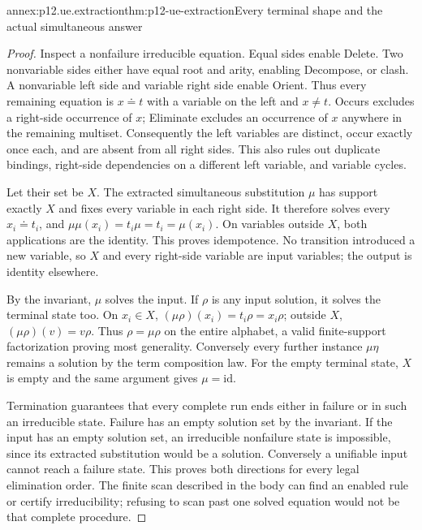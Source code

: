 \begin{annexitem}{annex:p12.ue.extraction}{thm:p12-ue-extraction}{Every terminal shape and the actual simultaneous answer}
\begin{proof}
Inspect a nonfailure irreducible equation. Equal sides enable Delete.
Two nonvariable sides either have equal root and arity, enabling
Decompose, or clash. A nonvariable left side and variable right side
enable Orient. Thus every remaining equation is \(x\doteq t\)
with a variable on the left and \(x\ne t\). Occurs excludes a
right-side occurrence of \(x\); Eliminate excludes an occurrence of
\(x\) anywhere in the remaining multiset. Consequently the left
variables are distinct, occur exactly once each, and are absent from
all right sides. This also rules out duplicate bindings, right-side
dependencies on a different left variable, and variable cycles.

Let their set be \(X\). The extracted simultaneous substitution
\(\mu\) has support exactly \(X\) and fixes every variable in each
right side. It therefore solves every \(x_i\doteq t_i\), and
\(\mu\mu(x_i)=t_i\mu=t_i=\mu(x_i)\). On variables outside
\(X\), both applications are the identity. This proves idempotence.
No transition introduced a new variable, so \(X\) and every right-side
variable are input variables; the output is identity elsewhere.

By the invariant, \(\mu\) solves the input. If \(\rho\) is any
input solution, it solves the terminal state too. On \(x_i\in X\),
\((\mu\rho)(x_i)=t_i\rho=x_i\rho\); outside \(X\),
\((\mu\rho)(v)=v\rho\). Thus \(\rho=\mu\rho\) on the entire
alphabet, a valid finite-support factorization proving most generality.
Conversely every further instance \(\mu\eta\) remains a solution by
the term composition law. For the empty terminal state, \(X\) is
empty and the same argument gives \(\mu=\mathrm{id}\).

Termination guarantees that every complete run ends either in failure
or in such an irreducible state. Failure has an empty solution set by
the invariant. If the input has an empty solution set, an irreducible
nonfailure state is impossible, since its extracted substitution would
be a solution. Conversely a unifiable input cannot reach a failure
state. This proves both directions for every legal elimination order.
The finite scan described in the body can find an enabled rule or
certify irreducibility; refusing to scan past one solved equation would
not be that complete procedure.
\end{proof}
\end{annexitem}

